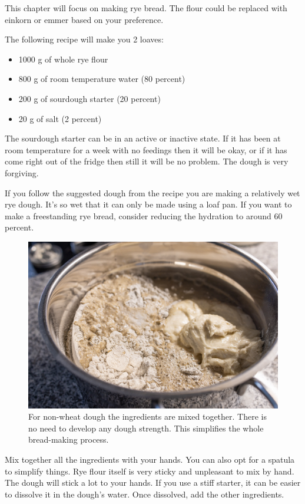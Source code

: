 This chapter will focus on making rye bread. The flour could
be replaced with einkorn or emmer based on your preference.

The following recipe will make you 2 loaves:
\begin{itemize}
  \item 1000 g of whole rye flour
  \item 800 g of room temperature water (80 percent)
  \item 200 g of sourdough starter (20 percent)
  \item 20 g of salt (2 percent)
\end{itemize}

The sourdough starter can be in an active or inactive state. If it has been
at room temperature for a week with no feedings then it will be okay, or 
if it has come right out of the fridge then still it will be no problem.
The dough is very forgiving.

If you follow the suggested dough from the recipe you are making a relatively
wet rye dough. It's so wet that it can only be made using a loaf pan. If
you want to make a freestanding rye bread, consider reducing the hydration
to around 60 percent.

\begin{figure}[!htb]
  \includegraphics[width=\textwidth]{ingredients}
  \caption{For non-wheat dough the ingredients are mixed together. There is no need
  to develop any dough strength. This simplifies the whole bread-making
  process.}%
  \label{fig:non-wheat-ingredients}
\end{figure}

Mix together all the ingredients with your hands. You can also
opt for a spatula to simplify things. Rye flour itself is very
sticky and unpleasant to mix by hand. The dough will stick
a lot to your hands. If you use a stiff starter, it can be
easier to dissolve it in the dough's water. Once dissolved,
add the other ingredients.

